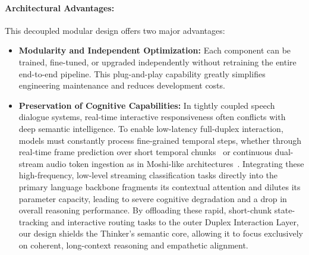 \paragraph{Architectural Advantages:}
This decoupled modular design offers two major advantages:
\begin{itemize}
    \item \textbf{Modularity and Independent Optimization:} Each component can be trained, fine-tuned, or upgraded independently without retraining the entire end-to-end pipeline. This plug-and-play capability greatly simplifies engineering maintenance and reduces development costs.
    
    \item \textbf{Preservation of Cognitive Capabilities:} In tightly coupled speech dialogue systems, real-time interactive responsiveness often conflicts with deep semantic intelligence. To enable low-latency full-duplex interaction, models must constantly process fine-grained temporal steps, whether through real-time frame prediction over short temporal chunks~\cite{thinkingmachines2026interactionmodels} or continuous dual-stream audio token ingestion as in Moshi-like architectures~\cite{defossez2024moshi}. Integrating these high-frequency, low-level streaming classification tasks directly into the primary language backbone fragments its contextual attention and dilutes its parameter capacity, leading to severe cognitive degradation and a drop in overall reasoning performance. By offloading these rapid, short-chunk state-tracking and interactive routing tasks to the outer Duplex Interaction Layer, our design shields the Thinker's semantic core, allowing it to focus exclusively on coherent, long-context reasoning and empathetic alignment.
\end{itemize}

